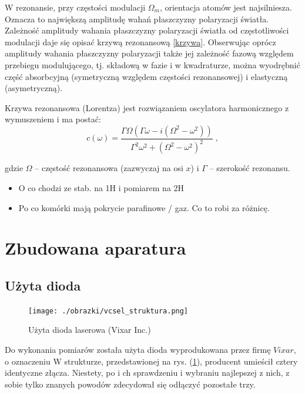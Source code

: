 \documentclass[a4paper,10pt]{article}
\begin{document}
W rezonansie, przy częstości modulacji $\Omega_m$, orientacja atomów jest najsilniesza. Oznacza to największą amplitudę wahań płaszczyzny polaryzacji światła. Zależność amplitudy wahania płaszczyzny polaryzacji światła
od częstotliwości modulacji daje się opisać krzywą rezonansową \ref{krzywa}. Obserwując oprócz amplitudy wahania płaszczyzny polaryzacji także jej zależność fazową względem przebiegu modulującego, tj. składową w fazie i w kwadraturze, można wyodrębnić część absorbcyjną (symetryczną względem częstości rezonansowej) i elastyczną (asymetryczną).

Krzywa rezonansowa (Lorentza) jest rozwiązaniem oscylatora harmonicznego z wymuszeniem i ma postać:
\begin{equation}
c(\omega)=\frac{\Gamma  \Omega  \left(\Gamma  \omega -i \left(\Omega ^2-\omega ^2\right)\right)}{\Gamma ^2 \omega ^2+\left(\Omega ^2-\omega ^2\right)^2} \; ,
\label{krzywa}
\end{equation}

gdzie $\Omega$ -- częstość rezonansowa (zazwyczaj na osi $x$) i $\Gamma$ -- szerokość rezonansu.\\

\begin{itemize}
 \item O co chodzi ze stab. na 1H i pomiarem na 2H
 \item Po co komórki mają pokrycie parafinowe / gaz. Co to robi za różnicę.
\end{itemize}


\pagebreak

\section{Zbudowana aparatura}

\subsection{Użyta dioda}

\begin{figure}
\begin{center}
 \texttt{[image: ./obrazki/vcsel\_struktura.png]}
\end{center}
\caption{Użyta dioda laserowa (Vixar Inc.)}
\label{struktura}
\end{figure}

Do wykonania pomiarów została użyta dioda wyprodukowana przez firmę $Vixar$, o oznaczeniu
W strukturze, przedstawionej na rys. (\ref{struktura}), producent umieścił cztery identyczne złącza. Niestety, po i ch sprawdzeniu i wybraniu najlepszej z nich, z sobie tylko znanych powodów zdecydował się odłączyć pozostałe trzy.
\end{document}
